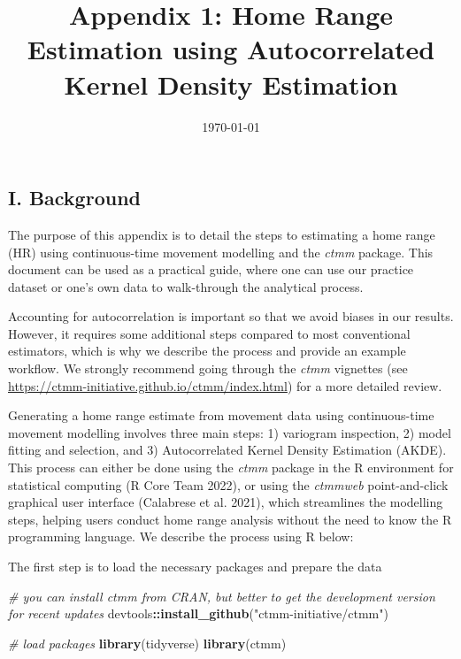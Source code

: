 \documentclass[
]{article}
\title{Appendix 1: Home Range Estimation using Autocorrelated Kernel
Density Estimation}
\author{}
\date{\vspace{-2.5em}\today}
\newenvironment{Shaded}{\begin{snugshade}}{\end{snugshade}}
\newcommand{\CommentTok}[1]{\textcolor[rgb]{0.56,0.35,0.01}{\textit{#1}}}
\newcommand{\FunctionTok}[1]{\textcolor[rgb]{0.13,0.29,0.53}{\textbf{#1}}}
\newcommand{\NormalTok}[1]{#1}
\newcommand{\SpecialCharTok}[1]{\textcolor[rgb]{0.81,0.36,0.00}{\textbf{#1}}}
\newcommand{\StringTok}[1]{\textcolor[rgb]{0.31,0.60,0.02}{#1}}
\begin{document}
\maketitle

\subsection{I. Background}\label{i.-background}

The purpose of this appendix is to detail the steps to estimating a home
range (HR) using continuous-time movement modelling and the \emph{ctmm}
package. This document can be used as a practical guide, where one can
use our practice dataset or one's own data to walk-through the
analytical process.

Accounting for autocorrelation is important so that we avoid biases in
our results. However, it requires some additional steps compared to most
conventional estimators, which is why we describe the process and
provide an example workflow. We strongly recommend going through the
\emph{ctmm} vignettes (see
\url{https://ctmm-initiative.github.io/ctmm/index.html}) for a more
detailed review.

Generating a home range estimate from movement data using
continuous-time movement modelling involves three main steps: 1)
variogram inspection, 2) model fitting and selection, and 3)
Autocorrelated Kernel Density Estimation (AKDE). This process can either
be done using the \emph{ctmm} package in the R environment for
statistical computing (R Core Team 2022), or using the \emph{ctmmweb}
point-and-click graphical user interface (Calabrese et al. 2021), which
streamlines the modelling steps, helping users conduct home range
analysis without the need to know the R programming language. We
describe the process using R below:

The first step is to load the necessary packages and prepare the data

\begin{Shaded}
\begin{Highlighting}[]
\CommentTok{\# you can install ctmm from CRAN, but better to get the development version for recent updates}
\NormalTok{devtools}\SpecialCharTok{::}\FunctionTok{install\_github}\NormalTok{(}\StringTok{"ctmm{-}initiative/ctmm"}\NormalTok{)}

\CommentTok{\# load packages}
\FunctionTok{library}\NormalTok{(tidyverse)}
\FunctionTok{library}\NormalTok{(ctmm)}
\end{Highlighting}
\end{Shaded}
\end{document}
